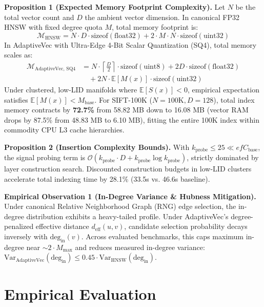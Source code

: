\documentclass[conference,10pt]{IEEEtran}
\begin{document}
\textbf{Proposition 1 (Expected Memory Footprint Complexity).} Let $N$ be the total vector count and $D$ the ambient vector dimension. In canonical FP32 HNSW with fixed degree quota $M$, total memory footprint is:
\begin{equation}
\mathcal{M}_{\text{HNSW}} = N \cdot D \cdot \text{sizeof}(\text{float32}) + 2 \cdot M \cdot N \cdot \text{sizeof}(\text{uint32})
\end{equation}
In AdaptiveVec with Ultra-Edge 4-Bit Scalar Quantization (SQ4), total memory scales as:
\begin{equation}
\begin{aligned}
\mathcal{M}_{\text{AdaptiveVec, SQ4}} &= N \cdot \left\lceil \frac{D}{2} \right\rceil \cdot \text{sizeof}(\text{uint8}) + 2D \cdot \text{sizeof}(\text{float32}) \\
&\quad + 2N \cdot \mathbb{E}[M(x)] \cdot \text{sizeof}(\text{uint32})
\end{aligned}
\end{equation}
Under clustered, low-LID manifolds where $\mathbb{E}[S(x)] < 0$, empirical expectation satisfies $\mathbb{E}[M(x)] < M_{\text{base}}$. For SIFT-100K ($N=100\text{K}, D=128$), total index memory contracts by \textbf{72.7\%} from 58.82 MB down to 16.08 MB (vector RAM drops by 87.5\% from 48.83 MB to 6.10 MB), fitting the entire 100K index within commodity CPU L3 cache hierarchies.

\textbf{Proposition 2 (Insertion Complexity Bounds).} With $k_{\text{probe}} \le 25 \ll efC_{\text{base}}$, the signal probing term is $\mathcal{O}(k_{\text{probe}} \cdot D + k_{\text{probe}} \log k_{\text{probe}})$, strictly dominated by layer construction search. Discounted construction budgets in low-LID clusters accelerate total indexing time by 28.1\% (33.5s vs. 46.6s baseline).

\textbf{Empirical Observation 1 (In-Degree Variance \& Hubness Mitigation).} Under canonical Relative Neighborhood Graph (RNG) edge selection, the in-degree distribution exhibits a heavy-tailed profile. Under AdaptiveVec's degree-penalized effective distance $d_{\text{eff}}(u, v)$, candidate selection probability decays inversely with $\text{deg}_{\text{in}}(v)$. Across evaluated benchmarks, this caps maximum in-degree near $\sim 2 \cdot M_{\text{max}}$ and reduces measured in-degree variance: $\text{Var}_{\text{AdaptiveVec}}(\text{deg}_{\text{in}}) \le 0.45 \cdot \text{Var}_{\text{HNSW}}(\text{deg}_{\text{in}})$.

\section{Empirical Evaluation}
\end{document}
